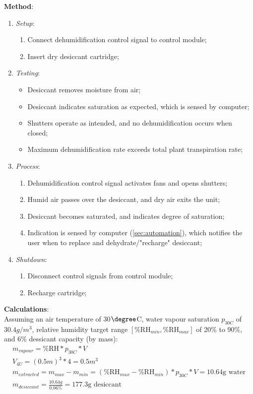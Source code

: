 \textbf{Method}:
\begin{enumerate}
    \item \textit{Setup}:
    \begin{enumerate}
        \item Connect dehumidification control signal to control module;
        \item Insert dry desiccant cartridge;
    \end{enumerate}
    \item \textit{Testing}:
    \begin{itemize}
        \item Desiccant removes moisture from air;
        \item Desiccant indicates saturation as expected, which is sensed by computer;
        \item Shutters operate as intended, and no dehumidification occurs when closed;
        \item Maximum dehumidification rate exceeds total plant transpiration rate;
    \end{itemize}
    \item \textit{Process}:
    \begin{enumerate}
        \item Dehumidification control signal activates fans and opens shutters;
        \item Humid air passes over the desiccant, and dry air exits the unit;
        \item Desiccant becomes saturated, and indicates degree of saturation;
        \item Indication is sensed by computer (\ref{sec:automation}), which notifies the user when to replace and dehydrate/"recharge" desiccant;
    \end{enumerate}
    \item \textit{Shutdown}:
    \begin{enumerate}
        \item Disconnect control signals from control module;
        \item Recharge cartridge;
    \end{enumerate}
\end{enumerate}

\textbf{Calculations}:\\
Assuming an air temperature of 30$\degree$C, water vapour saturation $p_{30C}$ of $30.4g/m^{3}$, relative humidity target range $[\text{\%RH}_{min},\text{\%RH}_{max}]$ of 20\% to 90\%, and 6\% dessicant capacity (by mass):
\begin{gather}
    m_{vapour} = \text{\%RH} * p_{30C} * V\\
    V_{4U} = (0.5m)^3 * 4 = 0.5m^{3} \\
    m_{extracted} = m_{max} - m_{min} = (\text{\%RH}_{max}-\text{\%RH}_{min}) * p_{30C} * V = 10.64\text{g water}\\
    m_{desiccant}=\frac{10.64g}{0.06 \%} = 177.3\text{g desiccant}
\end{gather}

